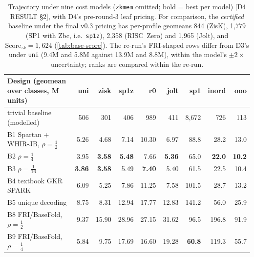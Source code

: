 \begin{table}[t]
\centering\footnotesize
\setlength{\tabcolsep}{3.5pt}
\begin{tabular}{@{}lrrrrrrrr@{}}
\toprule
Design (geomean over classes, M units) & uni & zisk & sp1z & r0 & jolt & sp1 & inord & ooo \\
\midrule
trivial baseline (modelled) & 506 & 301 & 406 & 989 & 411 & 8{,}672 & 726 & 113 \\
B1 Spartan + WHIR-JB, $\rho=\tfrac12$ & 5.26 & 4.68 & 7.14 & 10.30 & 6.97 & 88.8 & 28.2 & 13.0 \\
B2 $\rho=\tfrac14$ & 3.95 & \textbf{3.58} & \textbf{5.48} & 7.66 & \textbf{5.36} & 65.0 & \textbf{22.0} & \textbf{10.2} \\
B3 $\rho=\tfrac1{16}$ & \textbf{3.86} & \textbf{3.58} & 5.49 & \textbf{7.40} & 5.40 & 61.5 & 22.5 & 10.4 \\
B4 textbook GKR SPARK & 6.09 & 5.25 & 7.86 & 11.25 & 7.58 & 101.5 & 28.7 & 13.2 \\
B5 unique decoding & 8.75 & 8.31 & 12.94 & 17.77 & 12.83 & 141.2 & 56.0 & 25.9 \\
B8 FRI/BaseFold, $\rho=\tfrac12$ & 9.37 & 15.90 & 28.96 & 27.15 & 31.62 & 96.5 & 196.8 & 91.9 \\
B9 FRI/BaseFold, $\rho=\tfrac14$ & 5.84 & 9.75 & 17.69 & 16.60 & 19.28 & \textbf{60.8} & 119.3 & 55.7 \\
\bottomrule
\end{tabular}
\caption{Trajectory under nine cost models (\texttt{zkmem} omitted; bold = best per model)
[D4 RESULT §2], with D4's pre-round-3 leaf pricing. For comparison, the \emph{certified} baseline under
the final v0.3 pricing has per-profile geomeans 844 (ZisK), 1{,}779 (SP1 with Zbc, i.e.\
\texttt{sp1z}), 2{,}358 (RISC~Zero) and 1{,}965 (Jolt), and $\mathrm{Score}_{zk}=1{,}624$
(\cref{tab:base-score}). The re-run's FRI-shaped rows differ from D3's under \texttt{uni} (9.4M and 5.8M
against 13.9M and 8.8M), within the model's $\pm2\times$ uncertainty; ranks are compared within the
re-run.}
\label{tab:bench-models}
\end{table}

